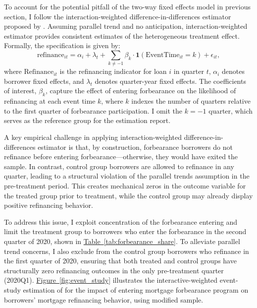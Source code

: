 \documentclass[11pt]{article}
\begin{document}
{To account for the potential pitfall of the two-way fixed effects model in previous section, I follow the interaction-weighted difference-in-differences estimator proposed by \citet{sunAbraham2021}. Assuming parallel trend and no anticipation, interaction-weighted estimator provides consistent estimates of the heterogeneous treatment effect. Formally, the specification is given by:
\begin{equation}
\label{equation:event_study}
\text{refinance}_{it} = \alpha_i + \lambda_t + \sum_{k \neq -1} \beta_k \cdot \mathbf{1}(\text{EventTime}_{it} = k) + \epsilon_{it},
\end{equation}
where $\text{Refinance}_{it}$ is the refinancing indicator for loan $i$ in quarter $t$, $\alpha_i$ denotes borrower fixed effects, and $\lambda_t$ denotes quarter-year fixed effects. The coefficients of interest, $\beta_k$, capture the effect of entering forbearance on the likelihood of refinancing at each event time $k$, where $k$ indexes the number of quarters relative to the first quarter of forbearance participation. I omit the $k = -1$ quarter, which serves as the reference group for the estimation report.

A key empirical challenge in applying interaction-weighted difference-in-differences estimator is that, by construction, forbearance borrowers do not refinance before entering forbearance—otherwise, they would have exited the sample. In contrast, control group borrowers are allowed to refinance in any quarter, leading to a structural violation of the parallel trends assumption in the pre-treatment period. This creates mechanical zeros in the outcome variable for the treated group prior to treatment, while the control group may already display positive refinancing behavior.

To address this issue, I exploit concentration of the forbearance entering and limit the treatment group to borrowers who enter the forbearance in the second quarter of 2020, shown in \hyperref[tab:forbearance_share]{Table~\ref*{tab:forbearance_share}}. To alleviate parallel trend concerns, I also exclude from the control group borrowers who refinance in the first quarter of 2020, ensuring that both treated and control groups have structurally zero refinancing outcomes in the only pre-treatment quarter (2020Q1). \hyperref[fig:event_study]{Figure~\ref*{fig:event_study}} illustrates the interactive-weighted
event-study estimation of \citet{sunAbraham2021} for the impact of entering mortgage forbearance program on borrowers' mortgage refinancing behavior, using modified sample.


}
\end{document}
